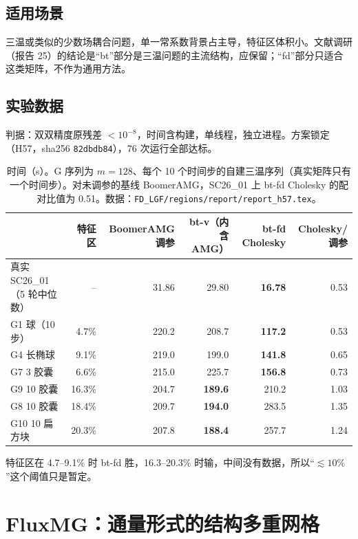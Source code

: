 \documentclass[11pt,a4paper]{ctexart}
\begin{document}
\subsection{适用场景}
三温或类似的少数场耦合问题，单一常系数背景占主导，特征区体积小。文献调研（报告 25）的结论是“bt”部分是三温问题的主流结构，应保留；“fd”部分只适合这类矩阵，不作为通用方法。

\subsection{实验数据}
判据：双双精度原残差 $<10^{-8}$，时间含构建，单线程，独立进程。方案锁定（H57，sha256 \texttt{82dbdb84}），76 次运行全部达标。
\begin{table}[H]
\centering\small
\footnotesize\setlength{\tabcolsep}{4pt}
\begin{tabular}{lrrrrr}
\toprule
& 特征区 & BoomerAMG 调参 & bt-v（内含 AMG） & bt-fd Cholesky & Cholesky/调参 \\
\midrule
真实 SC26\_01（5 轮中位数） & -- & 31.86 & 29.80 & \textbf{16.78} & 0.53 \\
G1 球（10 步） & 4.7\% & 220.2 & 208.7 & \textbf{117.2} & 0.53 \\
G4 长椭球 & 9.1\% & 219.0 & 199.0 & \textbf{141.8} & 0.65 \\
G7 3 胶囊 & 6.6\% & 215.0 & 225.7 & \textbf{156.8} & 0.73 \\
G9 10 胶囊 & 16.3\% & 204.7 & \textbf{189.6} & 210.2 & 1.03 \\
G8 10 胶囊 & 18.4\% & 209.7 & \textbf{194.0} & 283.5 & 1.35 \\
G10 10 扁方块 & 20.3\% & 207.8 & \textbf{188.4} & 257.7 & 1.24 \\
\bottomrule
\end{tabular}
\caption{时间（s）。G 序列为 $m=128$、每个 10 个时间步的自建三温序列（真实矩阵只有一个时间步）。对未调参的基线 BoomerAMG，SC26\_01 上 bt-fd Cholesky 的配对比值为 0.51。数据：\texttt{FD\_LGF/regions/report/report\_h57.tex}。}
\end{table}
特征区在 4.7--9.1\% 时 bt-fd 胜，16.3--20.3\% 时输，中间没有数据，所以“$\lesssim10\%$”这个阈值只是暂定。

\section{FluxMG：通量形式的结构多重网格}
\end{document}
